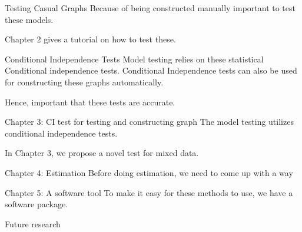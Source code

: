 \documentclass[aspectratio=169]{beamer}
\begin{document}
\begin{frame}{Testing Casual Graphs}
	Because of being constructed manually important to test these models.

	Chapter 2 gives a tutorial on how to test these.
\end{frame}

\begin{frame}{Conditional Independence Tests}
	Model testing relies on these statistical Conditional independence tests.
	Conditional Independence tests can also be used for constructing these graphs
	automatically.

	Hence, important that these tests are accurate.
\end{frame}

\begin{frame}{Chapter 3: CI test for testing and constructing graph}
	The model testing utilizes conditional independence tests.

	In Chapter 3, we propose a novel test for mixed data.
\end{frame}

\begin{frame}{Chapter 4: Estimation}
	Before doing estimation, we need to come up with a way 
\end{frame}

\begin{frame}{Chapter 5: A software tool}
	To make it easy for these methods to use, we have a software package.
\end{frame}

\begin{frame}{Future research}
\end{frame}
\end{document}

